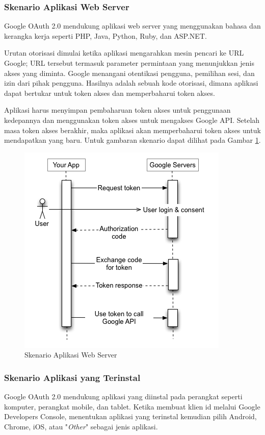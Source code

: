 \subsubsection{Skenario Aplikasi Web Server}
Google OAuth 2.0 mendukung aplikasi web server yang menggunakan bahasa dan kerangka kerja seperti PHP, Java, Python, Ruby, dan ASP.NET.

Urutan otorisasi dimulai ketika aplikasi mengarahkan mesin pencari ke URL Google; URL tersebut termasuk parameter permintaan yang menunjukkan jenis akses yang diminta. Google menangani otentikasi pengguna, pemilihan sesi, dan izin dari pihak pengguna. Hasilnya adalah sebuah kode otorisasi, dimana aplikasi dapat bertukar untuk token akses dan memperbaharui token akses.

Aplikasi harus menyimpan pembaharuan token akses untuk penggunaan kedepannya dan menggunakan token akses untuk mengakses Google API. Setelah masa token akses berakhir, maka aplikasi akan memperbaharui token akses untuk mendapatkan yang baru. Untuk gambaran skenario dapat dilihat pada Gambar \ref{fig:skenarioaplikasiwebserver}.

\begin{figure}[H]
\centering
\includegraphics[scale=1]{Gambar/skenario1.png}
\caption[Gambar Skenario Aplikasi Web Server]{Skenario Aplikasi Web Server} 
\label{fig:skenarioaplikasiwebserver}
\end{figure}

\subsubsection{Skenario Aplikasi yang Terinstal}
Google OAuth 2.0 mendukung aplikasi yang diinstal pada perangkat seperti komputer, perangkat mobile, dan tablet. Ketika membuat klien id melalui Google Developers Console, menentukan aplikasi yang terinstal kemudian pilih Android, Chrome, iOS, atau "{\it Other}" sebagai jenis aplikasi.

